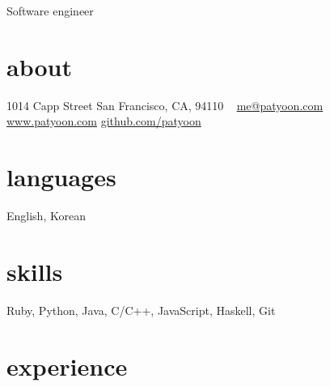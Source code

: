 \documentclass[]{patyoon-cv}
\begin{document}
{Software engineer}

\begin{aside}
  \section{about}
  1014 Capp Street
  San Francisco, CA, 94110
  ~
  \href{mailto:me@patyoon.com}{me@patyoon.com}
  \href{https://patyoon.com}{www.patyoon.com}
  \href{http://github.com/patyoon}{github.com/patyoon}
  \section{languages}
  English, Korean
  \section{skills}
  Ruby, Python,
  Java, C/C++,
  JavaScript,
  Haskell, Git
\end{aside}

\section{experience}
\end{document}
